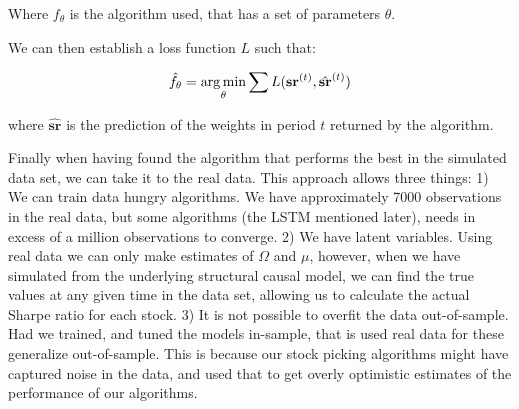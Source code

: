 Where $f_{\theta}$ is the algorithm used, that has a set of parameters $\theta$.

We can then establish a loss function $L$ such that:

\begin{equation}
    \hat{f_{\theta}} = \underset{\theta}{\operatorname*{arg\,min}} \sum L(\mathbf{sr}^{(t)}, \hat{\mathbf{sr}}^{(t)})
\end{equation}

where $\hat{\mathbf{sr}}$ is the prediction of the weights in period $t$ returned by the  algorithm.

Finally when having found the algorithm that performs the best in the simulated data set, we can take it to the real data. This approach allows three things: 1) We can train data hungry algorithms. We have approximately 7000 observations in the real data, but some algorithms (the LSTM mentioned later), needs in excess of a million observations to converge. 2) We have latent variables. Using real data we can only make estimates of $\Omega$ and $\mu$, however, when we have simulated from the underlying structural causal model, we can find the true values at any given time in the data set, allowing us to calculate the actual Sharpe ratio for each stock. 3) It is not possible to overfit the data out-of-sample. Had we trained, and tuned the models in-sample, that is used real data for these generalize out-of-sample. This is because our stock picking algorithms might have captured noise in the data, and used that to get overly optimistic estimates of the performance of our algorithms.
